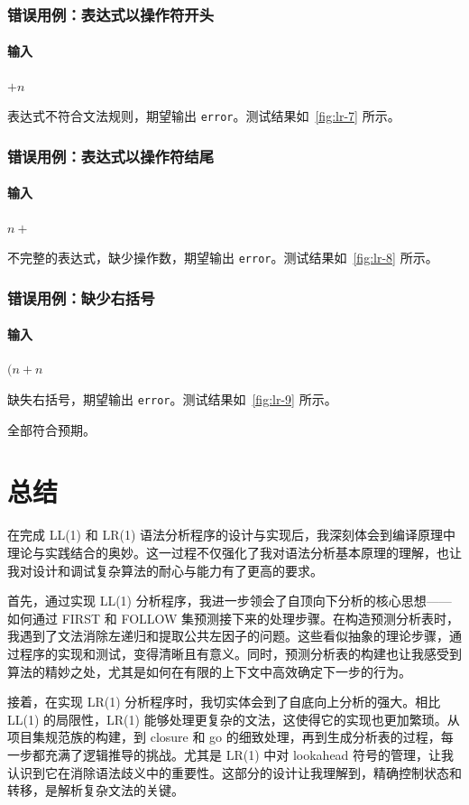 \subsubsection{错误用例：表达式以操作符开头}
\paragraph{输入} $+n$

表达式不符合文法规则，期望输出 \texttt{error}。测试结果如~\autoref{fig:lr-7} 所示。

\subsubsection{错误用例：表达式以操作符结尾}
\paragraph{输入} $n+$

不完整的表达式，缺少操作数，期望输出 \texttt{error}。测试结果如~\autoref{fig:lr-8} 所示。

\subsubsection{错误用例：缺少右括号}
\paragraph{输入} $(n+n$

缺失右括号，期望输出 \texttt{error}。测试结果如~\autoref{fig:lr-9} 所示。

全部符合预期。

\section{总结}

在完成 LL(1) 和 LR(1) 语法分析程序的设计与实现后，我深刻体会到编译原理中理论与实践结合的奥妙。这一过程不仅强化了我对语法分析基本原理的理解，也让我对设计和调试复杂算法的耐心与能力有了更高的要求。

首先，通过实现 LL(1) 分析程序，我进一步领会了自顶向下分析的核心思想——如何通过 FIRST 和 FOLLOW 集预测接下来的处理步骤。在构造预测分析表时，我遇到了文法消除左递归和提取公共左因子的问题。这些看似抽象的理论步骤，通过程序的实现和测试，变得清晰且有意义。同时，预测分析表的构建也让我感受到算法的精妙之处，尤其是如何在有限的上下文中高效确定下一步的行为。

接着，在实现 LR(1) 分析程序时，我切实体会到了自底向上分析的强大。相比 LL(1) 的局限性，LR(1) 能够处理更复杂的文法，这使得它的实现也更加繁琐。从项目集规范族的构建，到 closure 和 go 的细致处理，再到生成分析表的过程，每一步都充满了逻辑推导的挑战。尤其是 LR(1) 中对 lookahead 符号的管理，让我认识到它在消除语法歧义中的重要性。这部分的设计让我理解到，精确控制状态和转移，是解析复杂文法的关键。

